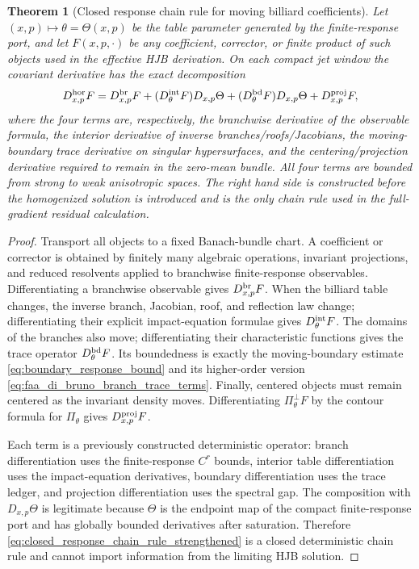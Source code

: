 \documentclass[12pt, letterpaper]{amsart}
\newcommand{\Hor}{\mathrm{hor}}
\theoremstyle{plain}
\newtheorem{theorem}{Theorem}[section]
\theoremstyle{definition}
\theoremstyle{remark}
\begin{document}
\begin{theorem}[Closed response chain rule for moving billiard coefficients]
\label{thm:closed_response_chain_rule_strengthened}
Let $(x,p)\mapsto\theta=\Theta(x,p)$ be the table parameter generated by the
finite-response port, and let $F(x,p,\cdot)$ be any coefficient, corrector, or
finite product of such objects used in the effective HJB derivation.  On each
compact jet window the covariant derivative has the exact decomposition
\begin{equation}
\label{eq:closed_response_chain_rule_strengthened}
    D_{x,p}^{\Hor}F
    =D^{\rm br}_{x,p}F
      +(D_\theta^{\rm int}F)D_{x,p}\Theta
      +(D_\theta^{\rm bd}F)D_{x,p}\Theta
      +D^{\rm proj}_{x,p}F,
\end{equation}
where the four terms are, respectively, the branchwise derivative of the
observable formula, the interior derivative of inverse branches/roofs/Jacobians,
the moving-boundary trace derivative on singular hypersurfaces, and the
centering/projection derivative required to remain in the zero-mean bundle.  All
four terms are bounded from strong to weak anisotropic spaces.  The right hand
side is constructed before the homogenized solution is introduced and is the
only chain rule used in the full-gradient residual calculation.
\end{theorem}

\begin{proof}
Transport all objects to a fixed Banach-bundle chart.  A coefficient or
corrector is obtained by finitely many algebraic operations, invariant
projections, and reduced resolvents applied to branchwise finite-response
observables.  Differentiating a branchwise observable gives
$D^{\rm br}_{x,p}F$.  When the billiard table changes, the inverse branch,
Jacobian, roof, and reflection law change; differentiating their explicit
impact-equation formulae gives $D_\theta^{\rm int}F$.  The domains of the
branches also move; differentiating their characteristic functions gives the
trace operator $D_\theta^{\rm bd}F$.  Its boundedness is exactly the
moving-boundary estimate \eqref{eq:boundary_response_bound} and its higher-order
version \eqref{eq:faa_di_bruno_branch_trace_terms}.  Finally, centered objects
must remain centered as the invariant density moves.  Differentiating
$\Pi_\theta^\perp F$ by the contour formula for $\Pi_\theta$ gives
$D^{\rm proj}_{x,p}F$.

Each term is a previously constructed deterministic operator: branch
differentiation uses the finite-response $C^r$ bounds, interior table
differentiation uses the impact-equation derivatives, boundary differentiation
uses the trace ledger, and projection differentiation uses the spectral gap.
The composition with $D_{x,p}\Theta$ is legitimate because $\Theta$ is the
endpoint map of the compact finite-response port and has globally bounded
derivatives after saturation.  Therefore \eqref{eq:closed_response_chain_rule_strengthened}
is a closed deterministic chain rule and cannot import information from the
limiting HJB solution.
\end{proof}
\end{document}
